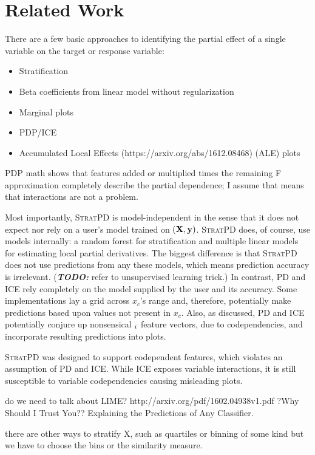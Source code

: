 \documentclass[12pt]{article}
\newcommand{\todo}[1]{{\bf\em TODO:} {{#1}}}
\newcommand{\spd}{\fontfamily{cmr}\textsc{\small StratPD}}
\begin{document}
\section{Related Work}

There are a few basic approaches to identifying the partial effect of a single variable on the target or response variable:

\begin{itemize}
\item Stratification
\item Beta coefficients from linear model without regularization
\item Marginal plots
\item PDP/ICE
\item Accumulated Local Effects (https://arxiv.org/abs/1612.08468) (ALE) plots
\end{itemize}

PDP math shows that features added or multiplied times the remaining F approximation completely describe the partial dependence; I assume that means that interactions are not a problem.

Most importantly, \spd{} is model-independent in the sense that it does not expect nor rely on a user's model trained on $({\bf X}, {\bf y})$.  \spd{} does, of course, use models internally: a random forest for stratification and multiple linear models for estimating local partial derivatives.  The biggest difference is that \spd{} does not use predictions from any these models, which means prediction accuracy is irrelevant.  (\todo{refer to unsupervised learning trick}.)  In contrast, PD and ICE rely completely on the model supplied by the user and its accuracy.  Some implementations lay a grid across $x_c$'s range and, therefore, potentially make predictions based upon values not present in $x_c$. Also, as discussed, PD and ICE potentially conjure up nonsensical ${\bf }_i$ feature vectors, due to codependencies, and incorporate resulting predictions into plots.

\spd{} was designed to support codependent features, which violates an assumption of PD and ICE. While ICE exposes variable interactions, it is still susceptible to variable codependencies causing misleading plots.

do we need to talk about LIME? http://arxiv.org/pdf/1602.04938v1.pdf ?Why Should I Trust You?? Explaining the Predictions of Any Classifier.

there are other ways to stratify X, such as quartiles or binning of some kind but we have to choose the bins or the similarity measure.
\end{document}
